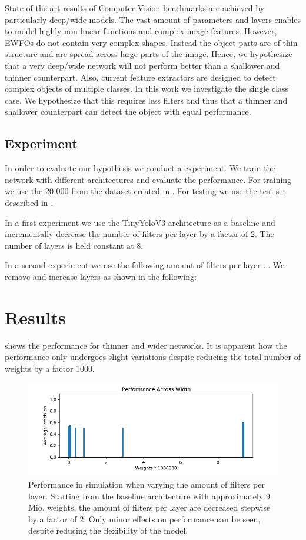 	State of the art results of Computer Vision benchmarks are achieved by particularly deep/wide models. The vast amount of parameters and layers enables to model highly non-linear functions and complex image features. However, \acp{EWFO} do not contain very complex shapes. Instead the object parts are of thin structure and are spread across large parts of the image. Hence, we hypothesize that a very deep/wide network will not perform better than a shallower and thinner counterpart. Also, current feature extractors are designed to detect complex objects of multiple classes. In this work we investigate the single class case. We hypothesize that this requires less filters and thus that a thinner and shallower counterpart can detect the object with equal performance.
	
	\subsection{Experiment}
	
	In order to evaluate our hypothesis we conduct a experiment. We train the network with different architectures and evaluate the performance. For training we use the 20 000 from the dataset created in . For testing we use the test set described in .
	
	In a first experiment we use the TinyYoloV3 architecture as a baseline and incrementally decrease the number of filters per layer by a factor of 2. The number of layers is held constant at 8.
	
	In a second experiment we use the following amount of filters per layer ... We remove and increase layers as shown in the following: 
	
	
	\section{Results}
	
	 shows the performance for thinner and wider networks. It is apparent how the performance only undergoes slight variations despite reducing the total number of weights by a factor 1000.
	
	
	\begin{figure}
		\includegraphics[width=\textwidth]{fig/perf_width}
		\caption{Performance in simulation when varying the amount of filters per layer. Starting from the baseline architecture with approximately 9 Mio. weights, the amount of filters per layer are decreased stepwise by a factor of 2. Only minor effects on performance can be seen, despite reducing the flexibility of the model.}
		\label{fig:perf_width}
	\end{figure}
	
